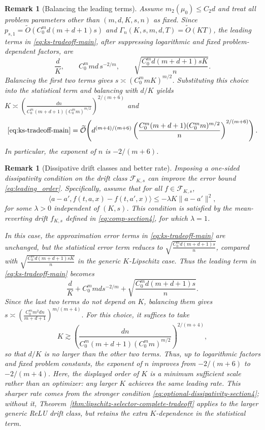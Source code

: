 \documentclass{article}
\newtheorem{rmk}[defn]{Remark}
\newcommand{\1}{\mathbbm{1}}
\numberwithin{equation}{section}
\begin{document}
\begin{rmk}[Balancing the leading terms]
\label{rem:tradeoff-section4}
Assume \(m_2(\mu_0)\le C_2d\) and treat all problem parameters other than
\((m,d,K,s,n)\) as fixed. Since
\(p_{s,1}=\widetilde O\!\left(C_0^m d(m+d+1)s\right)\) and
\(\Gamma_n(K,s,m,d,T)=\widetilde O(KT)\), the leading terms in
\eqref{eq:ks-tradeoff-main}, after suppressing logarithmic and fixed
problem-dependent factors, are
\[
\frac{d}{K},
\qquad
C_0^mmd\,s^{-2/m},
\qquad
\sqrt{\frac{C_0^m d(m+d+1)sK}{n}}.
\]
Balancing the first two terms gives
\(s\asymp(C_0^m mK)^{m/2}\). Substituting this choice into the statistical
term and balancing with \(d/K\) yields $K\asymp
\left(
\frac{dn}
{C_0^m(m+d+1)(C_0^m m)^{m/2}}
\right)^{2/(m+6)}$ and 
\begin{eqnarray}
 \eqref{eq:ks-tradeoff-main} = 
\widetilde {\mathcal O}\!\left(
d^{(m+4)/(m+6)}
\left(
\frac{C_0^m(m+d+1)(C_0^m m)^{m/2}}{n}
\right)^{2/(m+6)}
\right).   \label{eq:leading_order}
\end{eqnarray}
In particular, the exponent of \(n\) is \(-2/(m+6)\).
\end{rmk}




\begin{rmk}[Dissipative drift classes and better rate]
\label{rem:dissipative-comparison-section4}
Imposing a one-sided dissipativity condition on the drift class
$\mathcal F_{K,s}$ can improve the error bound
\eqref{eq:leading_order}. Specifically, assume that
for all $f\in\mathcal F_{K,s}$,
\begin{equation}
\label{eq:optional-dissipativity-section4}
\big\langle a-a',
f(t,a,x)-f(t,a',x)
\big\rangle
\le
-\lambda K\|a-a'\|^2 ,
\end{equation}
for some $\lambda>0$ independent of $(K,s)$.
This condition is satisfied by the mean-reverting
drift $f_{K,s}$ defined in \eqref{eq:comp-section4}, for which
$\lambda=1$.

In this case, the approximation error terms in
\eqref{eq:ks-tradeoff-main} are unchanged, but the statistical
error term reduces to
$\sqrt{\frac{C_0^m d(m+d+1)s}{n}}$, compared with
$\sqrt{\frac{C_0^m d(m+d+1)sK}{n}}$ in the generic
$K$-Lipschitz case. Thus the leading term in
\eqref{eq:ks-tradeoff-main} becomes
\[
\frac{d}{K}
+
C_0^mmds^{-2/m}
+
\sqrt{\frac{C_0^md(m+d+1)s}{n}} .
\]
Since the last two terms do not depend on $K$, balancing them gives $s
\asymp
\left(
\frac{C_0^m m^2dn}{m+d+1}
\right)^{m/(m+4)}.$
For this choice, it suffices to take
\[
K
\gtrsim
\left(
\frac{dn}
{C_0^m(m+d+1)(C_0^m m)^{m/2}}
\right)^{2/(m+4)},
\]
so that $d/K$ is no larger than the other two terms. Thus, up to
logarithmic factors and fixed problem constants, the exponent of
$n$ improves from $-2/(m+6)$ to $-2/(m+4)$. Here, the displayed
order of $K$ is a minimum sufficient scale rather than an optimizer:
any larger $K$ achieves the same leading rate. This sharper rate
comes from the stronger condition
\eqref{eq:optional-dissipativity-section4}; without it,
Theorem~\ref{thm:lipschitz-selector-complete-tradeoff} applies to the
larger generic ReLU drift class, but retains the extra $K$-dependence
in the statistical term.
\end{rmk}
\end{document}
